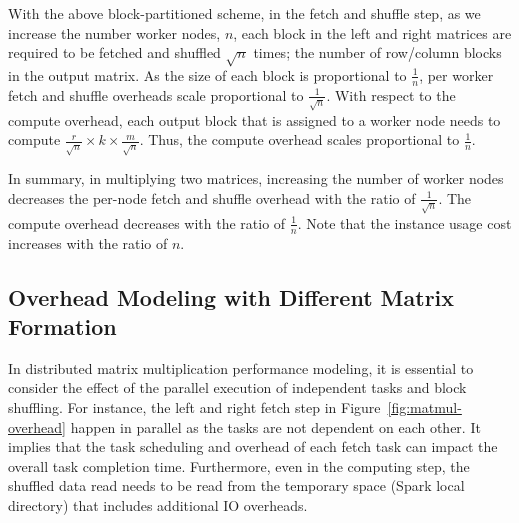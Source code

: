 \documentclass[10pt, conference, compsocconf]{IEEEtran}
\begin{document}
With the above block-partitioned scheme, in the fetch and shuffle step, as we increase the number worker nodes, $n$, each block in the left and right matrices are required to be fetched and shuffled $\sqrt{n}$ times; the number of row/column blocks in the output matrix. As the size of each block is proportional to $\frac{1}{n}$, per worker fetch and shuffle overheads scale proportional to $\frac{1}{\sqrt{n}}$. With respect to the compute overhead, each output block that is assigned to a worker node needs to compute $\frac{r}{\sqrt{n}}\times k \times \frac{m}{\sqrt{n}}$. Thus, the compute overhead scales proportional to $\frac{1}{n}$.

In summary, in multiplying two matrices, increasing the number of worker nodes decreases the per-node fetch and shuffle overhead with the ratio of $\frac{1}{\sqrt{n}}$. The compute overhead decreases with the ratio of $\frac{1}{n}$. Note that the instance usage cost increases with the ratio of $n$.

\subsection{Overhead Modeling with Different Matrix Formation}\label{sec:overhead-non-square}
In distributed matrix multiplication performance modeling, it is essential to consider the effect of the parallel execution of independent tasks and block shuffling. For instance, the left and right fetch step in Figure~\ref{fig:matmul-overhead} happen in parallel as the tasks are not dependent on each other. It implies that the task scheduling and overhead of each fetch task can impact the overall task completion time. Furthermore, even in the computing step, the shuffled data read needs to be read from the temporary space (Spark local directory) that includes additional IO overheads. 
\end{document}
